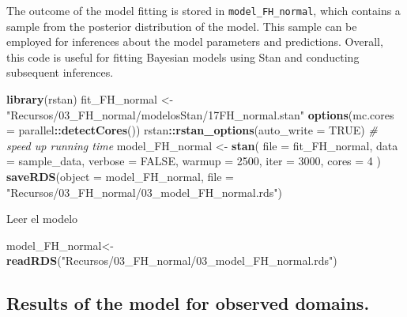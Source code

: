 \documentclass[
  12pt,
]{book}
\newenvironment{Shaded}{\begin{snugshade}}{\end{snugshade}}
\newcommand{\AttributeTok}[1]{\textcolor[rgb]{0.13,0.29,0.53}{#1}}
\newcommand{\CommentTok}[1]{\textcolor[rgb]{0.56,0.35,0.01}{\textit{#1}}}
\newcommand{\ConstantTok}[1]{\textcolor[rgb]{0.56,0.35,0.01}{#1}}
\newcommand{\DecValTok}[1]{\textcolor[rgb]{0.00,0.00,0.81}{#1}}
\newcommand{\FunctionTok}[1]{\textcolor[rgb]{0.13,0.29,0.53}{\textbf{#1}}}
\newcommand{\NormalTok}[1]{#1}
\newcommand{\OtherTok}[1]{\textcolor[rgb]{0.56,0.35,0.01}{#1}}
\newcommand{\SpecialCharTok}[1]{\textcolor[rgb]{0.81,0.36,0.00}{\textbf{#1}}}
\newcommand{\StringTok}[1]{\textcolor[rgb]{0.31,0.60,0.02}{#1}}
\begin{document}
The outcome of the model fitting is stored in \texttt{model\_FH\_normal}, which contains a sample from the posterior distribution of the model. This sample can be employed for inferences about the model parameters and predictions. Overall, this code is useful for fitting Bayesian models using Stan and conducting subsequent inferences.

\begin{Shaded}
\begin{Highlighting}[]
\FunctionTok{library}\NormalTok{(rstan)}
\NormalTok{fit\_FH\_normal }\OtherTok{\textless{}{-}} \StringTok{"Recursos/03\_FH\_normal/modelosStan/17FH\_normal.stan"}
\FunctionTok{options}\NormalTok{(}\AttributeTok{mc.cores =}\NormalTok{ parallel}\SpecialCharTok{::}\FunctionTok{detectCores}\NormalTok{())}
\NormalTok{rstan}\SpecialCharTok{::}\FunctionTok{rstan\_options}\NormalTok{(}\AttributeTok{auto\_write =} \ConstantTok{TRUE}\NormalTok{) }\CommentTok{\# speed up running time }
\NormalTok{model\_FH\_normal }\OtherTok{\textless{}{-}} \FunctionTok{stan}\NormalTok{(}
  \AttributeTok{file =}\NormalTok{ fit\_FH\_normal,  }
  \AttributeTok{data =}\NormalTok{ sample\_data,   }
  \AttributeTok{verbose =} \ConstantTok{FALSE}\NormalTok{,}
  \AttributeTok{warmup =} \DecValTok{2500}\NormalTok{,         }
  \AttributeTok{iter =} \DecValTok{3000}\NormalTok{,            }
  \AttributeTok{cores =} \DecValTok{4}              
\NormalTok{)}
\FunctionTok{saveRDS}\NormalTok{(}\AttributeTok{object =}\NormalTok{ model\_FH\_normal,}
        \AttributeTok{file =} \StringTok{"Recursos/03\_FH\_normal/03\_model\_FH\_normal.rds"}\NormalTok{)}
\end{Highlighting}
\end{Shaded}

Leer el modelo

\begin{Shaded}
\begin{Highlighting}[]
\NormalTok{model\_FH\_normal}\OtherTok{\textless{}{-}} \FunctionTok{readRDS}\NormalTok{(}\StringTok{"Recursos/03\_FH\_normal/03\_model\_FH\_normal.rds"}\NormalTok{)}
\end{Highlighting}
\end{Shaded}

\hypertarget{results-of-the-model-for-observed-domains.}{%
\subsection{Results of the model for observed domains.}\label{results-of-the-model-for-observed-domains.}}
\end{document}
